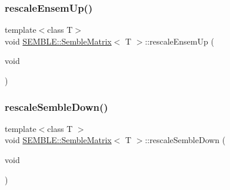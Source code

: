 \subsubsection{\texorpdfstring{rescaleEnsemUp()}{rescaleEnsemUp()}\hspace{0.1cm}{\footnotesize\ttfamily [2/2]}}
{\footnotesize\ttfamily template$<$class T$>$ \\
void \mbox{\hyperlink{structSEMBLE_1_1SembleMatrix}{S\+E\+M\+B\+L\+E\+::\+Semble\+Matrix}}$<$ T $>$\+::rescale\+Ensem\+Up (\begin{DoxyParamCaption}\item[{void}]{ }\end{DoxyParamCaption})\hspace{0.3cm}{\ttfamily [inline]}}

\mbox{\label{structSEMBLE_1_1SembleMatrix_a4d2124fd0ca69d6e0759080eb4aec67b}} 
\subsubsection{\texorpdfstring{rescaleSembleDown()}{rescaleSembleDown()}\hspace{0.1cm}{\footnotesize\ttfamily [1/2]}}
{\footnotesize\ttfamily template$<$class T $>$ \\
void \mbox{\hyperlink{structSEMBLE_1_1SembleMatrix}{S\+E\+M\+B\+L\+E\+::\+Semble\+Matrix}}$<$ T $>$\+::rescale\+Semble\+Down (\begin{DoxyParamCaption}\item[{void}]{ }\end{DoxyParamCaption})}

